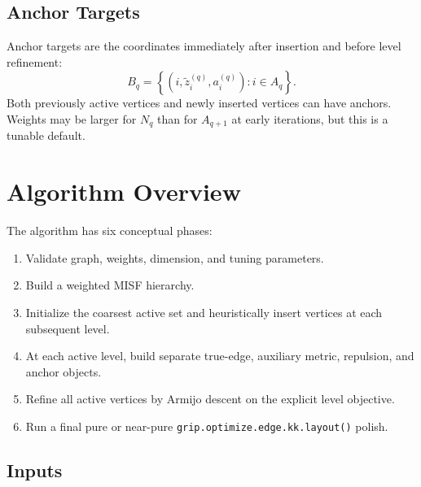 \documentclass[11pt]{article}
\newcommand{\Rfunc}[1]{\texttt{#1}}
\begin{document}
\subsection{Anchor Targets}

Anchor targets are the coordinates immediately after insertion and before
level refinement:
\[
  B_q =
  \left\{
    (i,\tilde{z}_i^{(q)},a_i^{(q)}) : i\in A_q
  \right\}.
\]
Both previously active vertices and newly inserted vertices can have anchors.
Weights may be larger for \(N_q\) than for \(A_{q+1}\) at early iterations, but
this is a tunable default.

\section{Algorithm Overview}

The algorithm has six conceptual phases:
\begin{enumerate}[leftmargin=2em]
  \item Validate graph, weights, dimension, and tuning parameters.
  \item Build a weighted MISF hierarchy.
  \item Initialize the coarsest active set and heuristically insert vertices at
  each subsequent level.
  \item At each active level, build separate true-edge, auxiliary metric,
  repulsion, and anchor objects.
  \item Refine all active vertices by Armijo descent on the explicit
  level objective.
  \item Run a final pure or near-pure
  \Rfunc{grip.optimize.edge.kk.layout()} polish.
\end{enumerate}

\subsection{Inputs}
\end{document}
